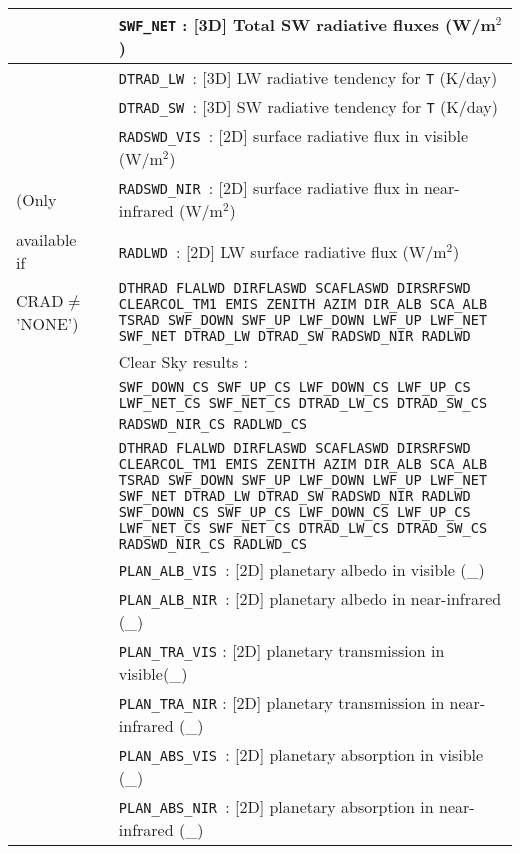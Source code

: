 \begin{center}
\begin{tabular}{|>{\centering}p{3cm}|>{\centering}p{2.5cm}|p{11cm}|}
& & {\tt SWF\_NET} : [3D] Total SW  radiative fluxes (W/m$^2$)\\\cline{3-3}
& & {\tt DTRAD\_LW }: [3D] LW radiative tendency for {\tt T} (K/day)\\\cline{3-3}
& & {\tt DTRAD\_SW }: [3D] SW radiative tendency for {\tt T} (K/day)\\\cline{3-3}
& & {\tt RADSWD\_VIS }: [2D] surface radiative flux in visible (W/m$^2$)\\\cline{3-3}
(Only& & {\tt RADSWD\_NIR }: [2D] surface radiative flux in near-infrared (W/m$^2$)\\\cline{3-3}
available if & & {\tt RADLWD }: [2D] LW surface radiative flux (W/m$^2$)\\\cline{2-3}
CRAD$\neq$'NONE')&\multirow{8}{*}{2} & {\tt DTHRAD FLALWD DIRFLASWD SCAFLASWD DIRSRFSWD CLEARCOL\_TM1 EMIS ZENITH AZIM DIR\_ALB SCA\_ALB TSRAD SWF\_DOWN SWF\_UP LWF\_DOWN LWF\_UP LWF\_NET SWF\_NET DTRAD\_LW DTRAD\_SW RADSWD\_NIR RADLWD }\\\cline{3-3}
&& Clear Sky results :\\
& &{\tt SWF\_DOWN\_CS SWF\_UP\_CS LWF\_DOWN\_CS LWF\_UP\_CS LWF\_NET\_CS SWF\_NET\_CS DTRAD\_LW\_CS DTRAD\_SW\_CS RADSWD\_NIR\_CS RADLWD\_CS }\ \\\cline{2-3}
&\multirow{13}{*}{3} &{\tt DTHRAD FLALWD DIRFLASWD SCAFLASWD DIRSRFSWD CLEARCOL\_TM1 EMIS ZENITH AZIM DIR\_ALB SCA\_ALB TSRAD SWF\_DOWN SWF\_UP LWF\_DOWN LWF\_UP LWF\_NET SWF\_NET DTRAD\_LW DTRAD\_SW RADSWD\_NIR RADLWD SWF\_DOWN\_CS SWF\_UP\_CS LWF\_DOWN\_CS LWF\_UP\_CS LWF\_NET\_CS SWF\_NET\_CS DTRAD\_LW\_CS DTRAD\_SW\_CS RADSWD\_NIR\_CS RADLWD\_CS  }  \\\cline{3-3}
& & {\tt PLAN\_ALB\_VIS }: [2D] planetary albedo in visible (\_) \\\cline{3-3}
& & {\tt PLAN\_ALB\_NIR }: [2D] planetary albedo  in near-infrared (\_) \\\cline{3-3}
& &{\tt PLAN\_TRA\_VIS} : [2D] planetary transmission in visible(\_) \\\cline{3-3}
& &{\tt PLAN\_TRA\_NIR} : [2D] planetary transmission in near-infrared (\_) \\\cline{3-3}
& & {\tt PLAN\_ABS\_VIS }: [2D]  planetary absorption in visible (\_)\\\cline{3-3}
& & {\tt PLAN\_ABS\_NIR }: [2D]  planetary absorption in  near-infrared (\_)\\\hline
\end{tabular} 
\end{center}

